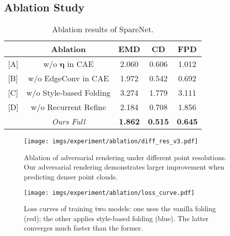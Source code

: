 \documentclass[final]{cvpr}
\begin{document}
\subsection{Ablation Study}


\begin{table}[t]
\begin{center}
\footnotesize
\setlength\tabcolsep{3.0pt}
\begin{tabular}{@{}lc|ccc@{}}
\toprule
& Ablation &  EMD & CD & FPD\\
\midrule
{[A]} & w/o $\bm{\eta}$ in CAE  &  2.060 & 0.606 &1.012\\
{[B]} & w/o EdgeConv in CAE &  1.972 & 0.542 &0.692\\
{[C]} & w/o Style-based Folding &  3.274 & 1.779 & 3.111\\
{[D]} & w/o Recurrent Refine &  2.184 & 0.708 &1.856\\
& \emph{Ours Full} & \textbf{1.862} & \textbf{0.515} & \textbf{0.645}\\
\bottomrule
\end{tabular}
\end{center}
\caption{Ablation results of SpareNet.}
\label{table:ablation}
\vspace{-1em}
\end{table}

\begin{figure}[t]
\centering
 \texttt{[image: imgs/experiment/ablation/diff\_res\_v3.pdf]}
 \footnotesize
\caption{Ablation of adversarial rendering under different point resolutions. Our adversarial rendering demonstrates larger improvement when predicting denser point clouds.}
\label{fig:differnet_resolution_ablation_emd}
\vspace{-1em}
\end{figure}

\begin{figure}[t]
\centering
 \texttt{[image: imgs/experiment/ablation/loss\_curve.pdf]}
 \footnotesize
\caption{Loss curves of training two models: one uses the vanilla folding (red); the other applies style-based folding (blue). The latter converges much faster than the former.}
\label{fig:adain_ablation}
\vspace{-1em}
\end{figure}
\end{document}
